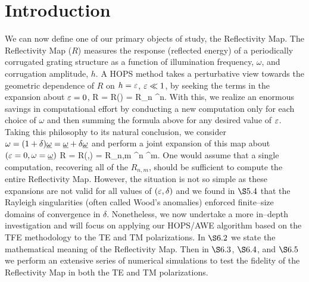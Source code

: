 \section{Introduction}
\label{intro:chapter 6 introduction}

We can
now define one of our primary objects of study, the Reflectivity
Map. The Reflectivity Map ($R$) measures the response (reflected energy) of a periodically
corrugated grating structure as
a function of illumination frequency, $\omega$, and corrugation
amplitude, $h$. A HOPS method
takes a perturbative view towards the geometric dependence of $R$
on $h = \varepsilon$, $\varepsilon \ll 1$, by seeking the terms in the expansion
about $\varepsilon = 0$,
\bes
R = R(\Eps) = \sumn R_n \Eps^n.
\ees
With this, we realize an enormous savings in computational effort by conducting a new computation only for each choice of $\omega$ and then summing the formula above for any desired value of $\varepsilon$. Taking this philosophy to its natural conclusion, we consider $\omega = (1 + \delta) \underline{\omega} = \underline{\omega} + \delta \underline{\omega}$
and perform a joint
expansion of this map about $(\varepsilon=0,\omega=\underline{\omega})$
\bes
R = R(\Eps,\delta) = \sumn \summ R_{n,m} \Eps^n \delta^m.
\ees
One would assume that a single computation, recovering all of the $R_{n,m}$, should be sufficient to compute the entire Reflectivity Map. However, the situation is not so simple as these expansions are not valid for all values of $(\varepsilon,\delta)$ and we found in $\S 5.4$
that the Rayleigh singularities (often called Wood's anomalies) enforced finite--size domains of convergence in $\delta$. Nonetheless, we now undertake a more in--depth investigation and will focus on applying our HOPS/AWE algorithm based on the TFE methodology to the TE and TM polarizations. In $\S 6.2$ we state the mathematical meaning of the Reflectivity Map. Then in $\S 6.3$, $\S 6.4$, and $\S 6.5$ we perform an extensive series of numerical simulations to test the fidelity of the Reflectivity Map in both the TE and TM polarizations.
